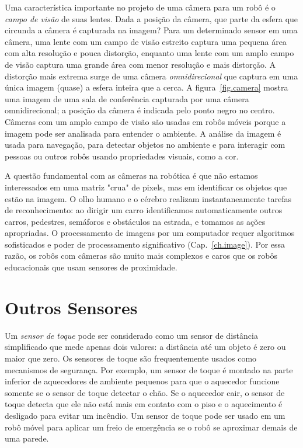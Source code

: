 Uma característica importante no projeto de uma câmera para um robô é o \emph{campo de visão} de suas lentes. Dada a posição da câmera, que parte da esfera que circunda a câmera é capturada na imagem? Para um determinado sensor em uma câmera, uma lente com um campo de visão estreito captura uma pequena área com alta resolução e pouca distorção, enquanto uma lente com um amplo campo de visão captura uma grande área com menor resolução e mais distorção. A distorção mais extrema surge de uma câmera \emph{omnidirecional} que captura em uma única imagem (quase) a esfera inteira que a cerca. A figura~\ref{fig.camera} mostra uma imagem de uma sala de conferência capturada por uma câmera omnidirecional; a posição da câmera é indicada pelo ponto negro no centro. Câmeras com um amplo campo de visão são usadas em robôs móveis porque a imagem pode ser analisada para entender o ambiente. A análise da imagem é usada para navegação, para detectar objetos no ambiente e para interagir com pessoas ou outros robôs usando propriedades visuais, como a cor.

A questão fundamental com as câmeras na robótica é que não estamos interessados em uma matriz "crua" de pixels, mas em identificar os objetos que estão na imagem. O olho humano e o cérebro realizam instantaneamente tarefas de reconhecimento: ao dirigir um carro identificamos automaticamente outros carros, pedestres, semáforos e obstáculos na estrada, e tomamos as ações apropriadas. O processamento de imagens por um computador requer algoritmos sofisticados e poder de processamento significativo (Cap.~\ref{ch.image}). Por essa razão, os robôs com câmeras são muito mais complexos e caros que os robôs educacionais que usam sensores de proximidade.

\section{Outros Sensores}\label{s.other-sensors}

Um \emph{sensor de toque} pode ser considerado como um sensor de distância simplificado que mede apenas dois valores: a distância até um objeto é zero ou maior que zero. Os sensores de toque são frequentemente usados como mecanismos de segurança. Por exemplo, um sensor de toque é montado na parte inferior de aquecedores de ambiente pequenos para que o aquecedor funcione somente se o sensor de toque detectar o chão. Se o aquecedor cair, o sensor de toque detecta que ele não está mais em contato com o piso e o aquecimento é desligado para evitar um incêndio. Um sensor de toque pode ser usado em um robô móvel para aplicar um freio de emergência se o robô se aproximar demais de uma parede.

